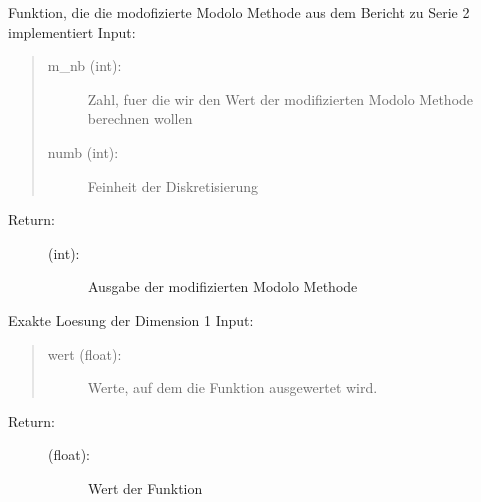 \documentclass[letterpaper,10pt,ngerman, oneside, openright]{sphinxmanual}
\begin{document}
\begin{fulllineitems}
\label{\detokenize{index:aufg_5_2.modo}}
Funktion, die die modofizierte Modolo Methode aus dem Bericht zu Serie 2 implementiert
Input:
\begin{quote}
\begin{description}
\item[{m\_nb (int):}] \leavevmode
Zahl, fuer die wir den Wert der modifizierten Modolo Methode berechnen wollen

\item[{numb (int):}] \leavevmode
Feinheit der Diskretisierung

\end{description}
\end{quote}
\begin{description}
\item[{Return:}] \leavevmode\begin{description}
\item[{(int):}] \leavevmode
Ausgabe der modifizierten Modolo Methode

\end{description}

\end{description}

\end{fulllineitems}


\begin{fulllineitems}
\label{\detokenize{index:aufg_5_2.ulsg1}}
Exakte Loesung der Dimension 1
Input:
\begin{quote}
\begin{description}
\item[{wert (float):}] \leavevmode
Werte, auf dem die Funktion ausgewertet wird.

\end{description}
\end{quote}
\begin{description}
\item[{Return:}] \leavevmode\begin{description}
\item[{(float):}] \leavevmode
Wert der Funktion

\end{description}

\end{description}

\end{fulllineitems}
\end{document}
